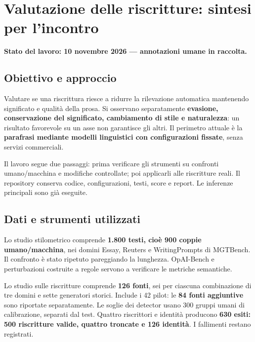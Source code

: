 \section{Valutazione delle riscritture: sintesi per l'incontro}\label{valutazione-delle-riscritture-sintesi-per-lincontro}

\textbf{Stato del lavoro: 10 novembre 2026 --- annotazioni umane in raccolta.}

\subsection{Obiettivo e approccio}\label{obiettivo-e-approccio}

Valutare se una riscrittura riesce a ridurre la rilevazione automatica mantenendo significato e qualità della prosa. Si osservano separatamente \textbf{evasione, conservazione del significato, cambiamento di stile e naturalezza}: un risultato favorevole su un asse non garantisce gli altri. Il perimetro attuale è la \textbf{parafrasi mediante modelli linguistici con configurazioni fissate}, senza servizi commerciali.

Il lavoro segue due passaggi: prima verificare gli strumenti su confronti umano/macchina e modifiche controllate; poi applicarli alle riscritture reali. Il repository conserva codice, configurazioni, testi, score e report. Le inferenze principali sono già eseguite.

\subsection{Dati e strumenti utilizzati}\label{dati-e-strumenti-utilizzati}

Lo studio stilometrico comprende \textbf{1.800 testi, cioè 900 coppie umano/macchina}, nei domini Essay, Reuters e WritingPrompts di MGTBench. Il confronto è stato ripetuto pareggiando la lunghezza. OpAI-Bench e perturbazioni costruite a regole servono a verificare le metriche semantiche.

Lo studio sulle riscritture comprende \textbf{126 fonti}, sei per ciascuna combinazione di tre domini e sette generatori storici. Include i 42 pilot: le \textbf{84 fonti aggiuntive} sono riportate separatamente. Le soglie dei detector usano 300 gruppi umani di calibrazione, separati dal test. Quattro riscrittori e identità producono \textbf{630 esiti: 500 riscritture valide, quattro troncate e 126 identità}. I fallimenti restano registrati.

